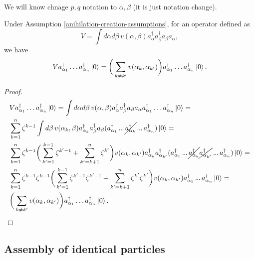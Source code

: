 \documentclass[main.tex]{subfiles}
\begin{document}
We will know chnage $p, q$ notation to $\alpha, \beta$ (it is just notation change).

\begin{proposition}
\label{2-particle-potentcial}
Under Assumption \ref{anihilation-creation-assumptions}, for an operator defined as
\begin{equation}
V = \int d\alpha d\beta\, v(\alpha, \beta) a_{\alpha}^\dagger a_{\beta}^\dagger a_{\beta} a_{\alpha},
\end{equation}
we have
\begin{equation}
V a^\dagger_{\alpha_1} \dots a^\dagger_{\alpha_n}\ket{0} = \bigg(\sum_{k\not=k'}v(\alpha_k, \alpha_{k'})\bigg) a^\dagger_{\alpha_1} \dots a^\dagger_{\alpha_n}\ket{0}.
\end{equation}
\end{proposition}
\begin{proof}
\begin{align*}
& V a^\dagger_{\alpha_1} \dots a^\dagger_{\alpha_n}\ket{0} = \int d\alpha d\beta\, v(\alpha, \beta) a_{\alpha}^\dagger a_{\beta}^\dagger a_{\beta} a_{\alpha} a^\dagger_{\alpha_1} \dots a^\dagger_{\alpha_n}\ket{0} = \\
& \sum_{k = 1}^n \zeta^{k - 1} \int d\beta\, v(\alpha_k, \beta)a_{\alpha_k}^\dagger a_{\beta}^\dagger a_{\beta} (a^\dagger_{\alpha_1} \tdots \cancel{a^\dagger_{\alpha_k}} \tdots a^\dagger_{\alpha_n})\ket{0} = \\
& \sum_{k = 1}^n \zeta^{k - 1}\bigg( \sum_{k'=1}^{k - 1} \zeta^{k' - 1}  + \sum_{k'=k+1}^{n} \zeta^{k'}\bigg) v(\alpha_k, \alpha_{k'})a_{\alpha_k}^\dagger a_{\alpha_{k'}}^\dagger (a^\dagger_{\alpha_1} \tdots \cancel{a^\dagger_{\alpha_k}} \cancel{a^\dagger_{\alpha_{k'}}}\tdots a^\dagger_{\alpha_n})\ket{0} = \\
& \sum_{k = 1}^n \zeta^{k-1} \zeta^{k - 1}\bigg( \sum_{k'=1}^{k - 1} \zeta^{k'- 1}\zeta^{k' - 1}  + \sum_{k'=k+1}^{n} \zeta^{k'} \zeta^{k'}\bigg) v(\alpha_k, \alpha_{k'})
a^\dagger_{\alpha_1} \tdots a^\dagger_{\alpha_n}\ket{0} = \\
& \bigg(\sum_{k\not=k'}v(\alpha_k, \alpha_{k'})\bigg) a^\dagger_{\alpha_1} \dots a^\dagger_{\alpha_n}\ket{0}.
\end{align*}
\end{proof}

\subsection{Assembly of identical particles}
\end{document}
